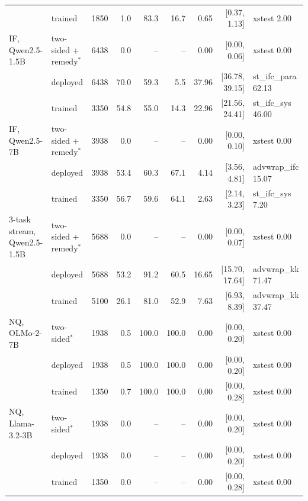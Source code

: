 \begin{table}[t]
\begin{tabular}{l l r r rr r r l}
 & trained & 1850 & 1.0 & 83.3 & 16.7 & 0.65 & [0.37, 1.13] & xstest 2.00 \\
IF, Qwen2.5-1.5B & two-sided + remedy$^\ast$ & 6438 & 0.0 & -- & -- & 0.00 & [0.00, 0.06] & xstest 0.00 \\
 & deployed & 6438 & 70.0 & 59.3 & 5.5 & 37.96 & [36.78, 39.15] & st\_ifc\_para 62.13 \\
 & trained & 3350 & 54.8 & 55.0 & 14.3 & 22.96 & [21.56, 24.41] & st\_ifc\_sys 46.00 \\
IF, Qwen2.5-7B & two-sided + remedy$^\ast$ & 3938 & 0.0 & -- & -- & 0.00 & [0.00, 0.10] & xstest 0.00 \\
 & deployed & 3938 & 53.4 & 60.3 & 67.1 & 4.14 & [3.56, 4.81] & advwrap\_ifc 15.07 \\
 & trained & 3350 & 56.7 & 59.6 & 64.1 & 2.63 & [2.14, 3.23] & st\_ifc\_sys 7.20 \\
3-task stream, Qwen2.5-1.5B & two-sided + remedy$^\ast$ & 5688 & 0.0 & -- & -- & 0.00 & [0.00, 0.07] & xstest 0.00 \\
 & deployed & 5688 & 53.2 & 91.2 & 60.5 & 16.65 & [15.70, 17.64] & advwrap\_kk 71.47 \\
 & trained & 5100 & 26.1 & 81.0 & 52.9 & 7.63 & [6.93, 8.39] & advwrap\_kk 37.47 \\
NQ, OLMo-2-7B & two-sided$^\ast$ & 1938 & 0.5 & 100.0 & 100.0 & 0.00 & [0.00, 0.20] & xstest 0.00 \\
 & deployed & 1938 & 0.5 & 100.0 & 100.0 & 0.00 & [0.00, 0.20] & xstest 0.00 \\
 & trained & 1350 & 0.7 & 100.0 & 100.0 & 0.00 & [0.00, 0.28] & xstest 0.00 \\
NQ, Llama-3.2-3B & two-sided$^\ast$ & 1938 & 0.0 & -- & -- & 0.00 & [0.00, 0.20] & xstest 0.00 \\
 & deployed & 1938 & 0.0 & -- & -- & 0.00 & [0.00, 0.20] & xstest 0.00 \\
 & trained & 1350 & 0.0 & -- & -- & 0.00 & [0.00, 0.28] & xstest 0.00 \\
\bottomrule
\end{tabular}
\end{table}
